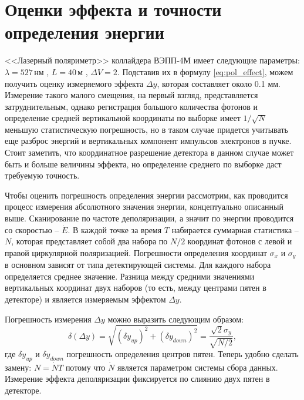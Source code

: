 \section{Оценки эффекта и точности определения энергии}
<<Лазерный поляриметр>> коллайдера ВЭПП-4М имеет следующие параметры: $\lambda = 527$\,нм , $L = 40$\,м , $\Delta V = 2$. Подставив их в формулу \ref{eq:pol_effect}, можем получить оценку измеряемого эффекта $\Delta y$, которая составляет около  0.1 мм. Измерение такого малого смещения, на первый взгляд, представляется затруднительным, однако регистрация большого количества фотонов и определение средней вертикальной координаты по выборке имеет $1/\sqrt{N}$ меньшую статистическую погрешность, но в таком случае придется учитывать еще разброс энергий  и вертикальных компонент импульсов электронов в пучке. Стоит заметить, что координатное разрешение детектора в данном случае может быть и больше величины эффекта, но определение среднего по выборке даст требуемую точность. 
\par Чтобы оценить погрешность определения энергии рассмотрим, как проводится процесс измерения абсолютного значения энергии, концептуально описанный выше. Сканирование по частоте деполяризации, а значит по энергии проводится со скоростью -- $\dot{E}$. В каждой точке за время $T$ набирается суммарная статистика -- $N$, которая представляет собой два набора по $N/2$ координат фотонов с левой и правой циркулярной поляризацией. Погрешности определения координат $\sigma_x$ и $\sigma_y$  в основном зависят от типа детектирующей системы. Для каждого набора определяется среднее значение. Разница между средними значениями вертикальных координат двух наборов (то есть, между центрами пятен в детекторе) и является измеряемым эффектом $\Delta y$. 

 Погрешность измерения $\Delta y$ можно выразить следующим образом: 
\begin{equation}
	\delta(\Delta y) = \sqrt{(\delta y_{up})^2 + (\delta y_{down})^2} = \frac{\sqrt{2} \sigma_y}{\sqrt{N/2}},
\end{equation}
где $\delta y_{up}$ и $\delta y_{down}$ погрешность определения центров пятен.
Теперь удобно сделать замену: $N = \dot{N}T$ потому что $\dot{N}$ является параметром системы сбора данных. Измерение эффекта деполяризации фиксируется по слиянию двух пятен в детекторе. 

